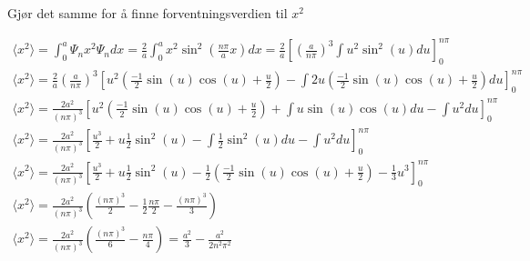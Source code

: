 \documentclass[11pt, A4paper,norsk]{article}
\begin{document}
			\begin{flushleft}
Gjør det samme for å finne forventningsverdien til $x^2$
			\end{flushleft}
			\begin{gather*}
\langle x^2 \rangle = \int_{0}^{a} \Psi_n x^2 \Psi_n dx = \frac{2}{a} \int_{0}^{a} x^2 \sin^2\left( \frac{n \pi}{a} x \right) dx = \frac{2}{a} \left[ \left( \frac{a}{n \pi} \right)^3 \int u^2 \sin^2(u) du \right]_{0}^{n \pi} \\
\langle x^2 \rangle = \frac{2}{a} \left( \frac{a}{n \pi} \right)^3 \left[ u^2 \left( \frac{-1}{2} \sin(u)\cos(u) + \frac{u}{2} \right) - \int 2 u \left( \frac{-1}{2} \sin(u)\cos(u) + \frac{u}{2} \right) du \right]_{0}^{n \pi} \\
\langle x^2 \rangle = \frac{2a^2}{(n \pi)^3}  \left[ u^2 \left( \frac{-1}{2} \sin(u)\cos(u) + \frac{u}{2} \right) + \int u \sin(u)\cos(u) du - \int u^2 du \right]_{0}^{n \pi} \\
\langle x^2 \rangle = \frac{2a^2}{(n \pi)^3} \left[ \frac{u^3}{2} + u \frac{1}{2} \sin^2(u) - \int \frac{1}{2} \sin^2(u) du  - \int u^2 du \right]_{0}^{n \pi} \\
\langle x^2 \rangle = \frac{2a^2}{(n \pi)^3} \left[ \frac{u^3}{2} + u \frac{1}{2} \sin^2(u) - \frac{1}{2} \left( \frac{-1}{2} \sin(u)\cos(u) + \frac{u}{2} \right)  - \frac{1}{3} u^3 \right]_{0}^{n \pi} \\
\langle x^2 \rangle = \frac{2a^2}{(n \pi)^3} \left( \frac{(n \pi)^3}{2} - \frac{1}{2} \frac{n \pi}{2} - \frac{(n \pi)^3}{3} \right) \\
\langle x^2 \rangle = \frac{2a^2}{(n \pi)^3} \left( \frac{(n \pi)^3}{6} - \frac{n \pi}{4} \right) = \frac{a^2}{3} - \frac{a^2}{2n^2\pi^2}
			\end{gather*}
\end{document}
